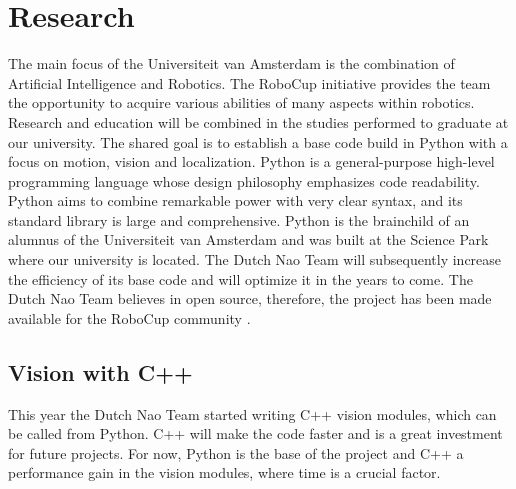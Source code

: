 \documentclass[11pt]{article}
\begin{document}
\section{Research}
The main focus of the Universiteit van Amsterdam is the combination of Artificial Intelligence and Robotics. The RoboCup initiative provides the team the opportunity to acquire various abilities of many aspects within robotics.
Research and education will be combined in the studies performed to graduate at our university. The shared goal is to establish a base code build in Python with a focus on motion, vision and localization. 
Python is a general-purpose high-level programming language whose design philosophy emphasizes code readability. Python aims to combine remarkable power with very clear syntax, and its standard library is large and comprehensive. 
Python is the brainchild of an alumnus of the Universiteit van Amsterdam and was built at the Science Park where our university is located. 
The Dutch Nao Team will subsequently increase the efficiency of its base code and will optimize it in the years to come. 
The Dutch Nao Team believes in open source, therefore, the project has been made available for the RoboCup community \cite{DutchNaoTeamTechReport2011}.
\subsection{Vision with C++}
This year the Dutch Nao Team started writing C++ vision modules, which can be called from Python. C++ will make the code faster and is a great investment for future projects. For now, Python is the base of the project and C++ a performance gain in the vision modules, where time is a crucial factor.
\end{document}
